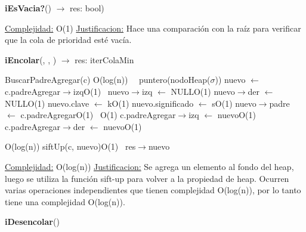 \begin{Representacion}
\begin{Algoritmos}
\begin{algorithm}[H]{\textbf{iEsVacia?}() $\to$ res: bool)}
\begin{algorithmic}[1]
		\medskip
		\Statex \underline{Complejidad:} O(1)
			\Statex \underline{Justificacion:} Hace una comparación con la raíz para verificar que la cola de prioridad esté vacía.
	\end{algorithmic}
\end{algorithm}

\begin{algorithm}[H]{\textbf{iEncolar}(, , ) $\to$ res: iterColaMin}
	\begin{algorithmic}[1]

		\State BuscarPadreAgregar(c) \Comment O(log(n))
		\,
		\ puntero(nodoHeap($\sigma$)) nuevo $\leftarrow$ c.padreAgregar$\rightarrow$izq\Comment O(1)
		\,
		\State nuevo$\rightarrow$izq $\leftarrow$ NULL\Comment O(1)
		\State nuevo$\rightarrow$der $\leftarrow$ NULL\Comment O(1)
		\State nuevo.clave $\leftarrow$ k\Comment O(1)
		\State nuevo.significado $\leftarrow$ s\Comment O(1)
		\State nuevo$\rightarrow$padre $\leftarrow$ c.padreAgregar\Comment O(1)
		\,	
		\Comment O(1)
			\State c.padreAgregar$\rightarrow$izq $\leftarrow$ nuevo\Comment O(1)
		\,
		\Else
			\State c.padreAgregar$\rightarrow$der $\leftarrow$ nuevo\Comment O(1)
		\EndIf
		\,
				
		\Comment O(log(n))
			\State siftUp(c, nuevo)\Comment O(1)
		\EndWhile			
		\,		
		\State res$\rightarrow$nuevo
		
		
		\medskip
		\Statex \underline{Complejidad:} O(log(n))
			\Statex \underline{Justificacion:} Se agrega un elemento al fondo del heap, luego se utiliza la función sift-up para volver a la propiedad de heap. Ocurren varias operaciones independientes que tienen complejidad O(log(n)), por lo tanto tiene una complejidad O(log(n)).
	\end{algorithmic}
\end{algorithm}


\begin{algorithm}[H]{\textbf{iDesencolar}(})
	\begin{algorithmic}[1]


\end{algorithmic}
\end{algorithm}
\end{Algoritmos}
\end{Representacion}
